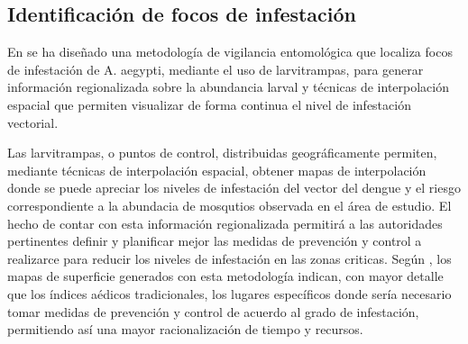 \subsection{Identificación de focos de infestación}
\label{sec:cap4-identificacion-focos}

En \citet{NINO2011} se ha diseñado una metodología de vigilancia entomológica que localiza focos
de infestación de A. aegypti, mediante el uso de larvitrampas, para generar información
regionalizada sobre la abundancia larval y técnicas de interpolación espacial que permiten
visualizar de forma continua el nivel de infestación vectorial.

Las larvitrampas, o puntos de control, distribuidas geográficamente permiten, mediante técnicas de
interpolación espacial, obtener mapas de interpolación donde se puede apreciar los niveles de
infestación del vector del dengue y el riesgo correspondiente a la abundacia de mosqutios
observada en el área de estudio. El hecho de contar con esta información regionalizada permitirá
a las autoridades pertinentes definir y planificar mejor las medidas de prevención y control a
realizarce para reducir los niveles de infestación en las zonas criticas. Según \citet{NINO2011},
los mapas de superficie generados con esta metodología indican, con mayor detalle que los índices
aédicos tradicionales, los lugares específicos donde sería necesario tomar medidas de prevención y
control de acuerdo al grado de infestación, permitiendo así una mayor racionalización de tiempo y
recursos.
